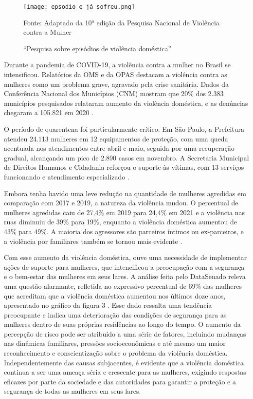 \documentclass[
    article,			%
    12pt,				%
    oneside,            %
    a4paper,			%
    english,			%
    brazil,				%
    ]{abntex2}
\begin{document}
\begin{figure}[ht]
    \centering
    \texttt{[image: epsodio e já sofreu.png]}\\
    \caption{“Pesquisa sobre episódios de violência doméstica”}
        Fonte: Adaptado da 10° edição da Pesquisa Nacional de Violência contra a Mulher
    \label{fig:infografico}
\end{figure}

    Durante a pandemia de COVID-19, a violência contra a mulher no Brasil se intensificou. Relatórios da OMS e da OPAS destacam a violência contra as mulheres como um problema grave, agravado pela crise sanitária. Dados da Conferência Nacional dos Municípios (CNM) mostram que 20\% dos 2.383 municípios pesquisados relataram aumento da violência doméstica, e as denúncias chegaram a 105.821 em 2020 \cite{relatorio}.

    O período de quarentena foi particularmente crítico. Em São Paulo, a Prefeitura atendeu 24.113 mulheres em 12 equipamentos de proteção, com uma queda acentuada nos atendimentos entre abril e maio, seguida por uma recuperação gradual, alcançando um pico de 2.890 casos em novembro. A Secretaria Municipal de Direitos Humanos e Cidadania reforçou o suporte às vítimas, com 13 serviços funcionando e atendimento especializado \cite{cidadeSP_2021} \cite{vulnerabilidadeCovid_2020}.

    Embora tenha havido uma leve redução na quantidade de mulheres agredidas em comparação com 2017 e 2019, a natureza da violência mudou. O percentual de mulheres agredidas caiu de 27,4\% em 2019 para 24,4\% em 2021 e a violência nas ruas diminuiu de 39\% para 19\%, enquanto a violência doméstica aumentou de 43\% para 49\%. A maioria dos agressores são parceiros íntimos ou ex-parceiros, e a violência por familiares também se tornou mais evidente \cite{pandemia}.

    Com esse aumento da violência doméstica, ouve uma necessidade de implementar ações de suporte para mulheres, que intencificou a preocupação com a segurança e o bem-estar das mulheres em seus lares. A análise feita pelo DataSenado releva uma questão alarmante, refletida no expressivo percentual de 69\% das mulheres que acreditam que a violência doméstica aumentou nos últimos doze anos, apresentado no gráfico da figura 3 \cite{senadoSP_2023}. Esse dado ressalta uma tendência preocupante e indica uma deterioração das condições de segurança para as mulheres dentro de suas próprias residências ao longo do tempo. O aumento da percepção de risco pode ser atribuído a uma série de fatores, incluindo mudanças nas dinâmicas familiares, pressões socioeconômicas e até mesmo um maior reconhecimento e conscientização sobre o problema da violência doméstica. Independentemente das causas subjacentes, é evidente que a violência doméstica continua a ser uma ameaça séria e crescente para as mulheres, exigindo respostas eficazes por parte da sociedade e das autoridades para garantir a proteção e a segurança de todas as mulheres em seus lares. 
\end{document}
